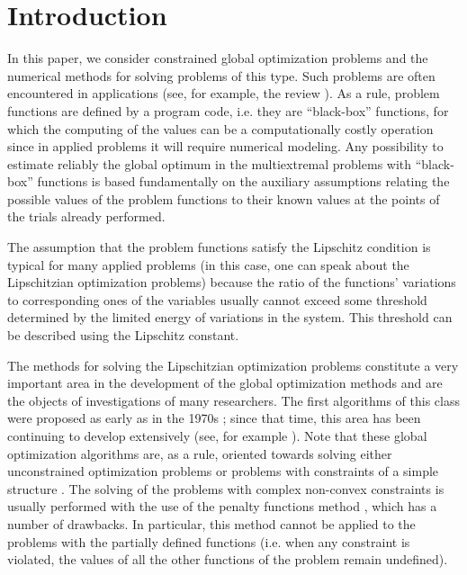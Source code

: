 \documentclass[review]{elsarticle}
\begin{document}
\section{Introduction}
	In this paper, we consider constrained global optimization problems and the numerical methods for solving problems of this type. Such problems are often encountered in applications (see, for example, the review \cite{Pinter2006}). As a rule, problem functions are defined by a program code, i.e. they are “black-box” functions, for which the computing of the values can be a computationally costly operation since in applied problems it will require  numerical modeling. Any  possibility to estimate reliably the global optimum in the multiextremal problems with “black-box” functions is based fundamentally on the auxiliary assumptions relating the possible values of the problem functions to their known values at the points of the trials already performed.
	
	The assumption that the problem functions satisfy the Lipschitz condition is typical for many applied problems (in this case, one can speak about the Lipschitzian optimization problems) because the ratio of the functions’ variations to corresponding ones of the variables usually cannot exceed some threshold determined by the limited energy of variations in the system. This threshold can be described using the Lipschitz constant.
	
	The methods for solving the Lipschitzian optimization problems constitute a very important area in the development of the global optimization methods and are the objects of investigations of many researchers. The first algorithms of this class were proposed as early as in the 1970s \cite{Evtushenko1971, Piyavskii1972, Shubert1972, Strongin1970}; since that time, this area has been continuing to develop extensively (see, for example \cite{Evtushenko2009, Evtushenko2013, Strongin2000, Sergeyev2013, Jones2009}). Note that these global optimization algorithms are, as a rule, oriented towards solving either  unconstrained optimization problems 
	\cite{Paulavicius2014, Sergeyev2015, Pinter1996, Jones1993, Gablonsky2001}
or problems with constraints of a simple structure \cite{Vaz2009, Paulavicius2016}. The solving of the problems with complex non-convex constraints is usually performed with the use of the penalty functions method \cite{Stripinis2019, Pillo2012, Pillo2016}, which has a number of drawbacks.  In particular, this method cannot be applied to the problems with the partially defined functions (i.e. when any constraint is violated, the values of all the other functions of the problem remain undefined).
	
\end{document}
